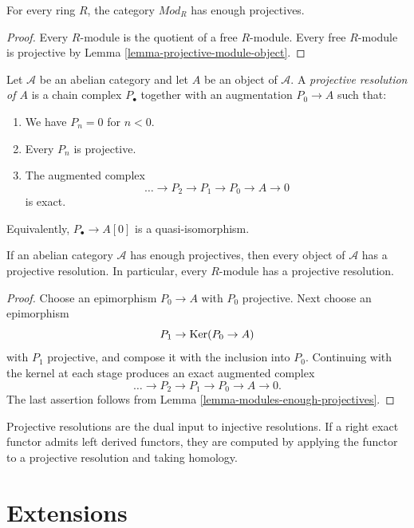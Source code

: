 \begin{lemma}
\label{lemma-modules-enough-projectives}
For every ring $R$, the category
$\mathit{Mod}_R$ has enough projectives.
\end{lemma}

\begin{proof}
Every $R$-module is the quotient of a free
$R$-module. Every free $R$-module is
projective by Lemma
\ref{lemma-projective-module-object}.
\end{proof}

\begin{definition}
\label{definition-projective-resolution}
Let $\mathcal{A}$ be an abelian category
and let $A$ be an object of $\mathcal{A}$.
A {\it projective resolution of $A$} is a
chain complex $P_\bullet$ together with an
augmentation $P_0\to A$ such that:
\begin{enumerate}
\item We have $P_n=0$ for $n<0$.
\item Every $P_n$ is projective.
\item The augmented complex
$$
\ldots\to P_2\to P_1\to P_0
\to A\to 0
$$
is exact.
\end{enumerate}
Equivalently, $P_\bullet\to A[0]$ is a
quasi-isomorphism.
\end{definition}

\begin{lemma}
\label{lemma-projective-resolutions-exist}
If an abelian category $\mathcal{A}$ has
enough projectives, then every object of
$\mathcal{A}$ has a projective resolution.
In particular, every $R$-module has a
projective resolution.
\end{lemma}

\begin{proof}
Choose an epimorphism $P_0\to A$ with
$P_0$ projective. Next choose an
epimorphism
$$
P_1\to\mathop{\mathrm{Ker}}(P_0\to A)
$$
with $P_1$ projective, and compose it with
the inclusion into $P_0$. Continuing with
the kernel at each stage produces an exact
augmented complex
$$
\ldots\to P_2\to P_1\to P_0
\to A\to 0.
$$
The last assertion follows from Lemma
\ref{lemma-modules-enough-projectives}.
\end{proof}

\noindent
Projective resolutions are the dual input
to injective resolutions. If a right exact
functor admits left derived functors, they
are computed by applying the functor to a
projective resolution and taking homology.

\section{Extensions}
\label{section-extensions}

